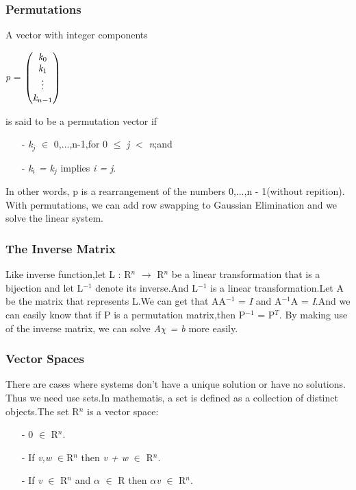 \documentclass{article}
\begin{document}
\subsubsection{Permutations}
A vector with integer components
\begin{center}
\emph{p} = 
\(
\begin{pmatrix}
    \emph{k}_{0} \\
    \emph{k}_{1} \\
    \vdots \\
    \emph{k}_{n-1} \\
\end{pmatrix}
\) 
\end{center}
is said to be a permutation vector if
\begin{itemize}
\item[-]\emph{k}$_{j}$ $\in$ {0,...,n-1},for 0 $\leq$ \emph{j} $<$ \emph{n};and
\item[-]\emph{k$_{i}$ = k$_{j}$} implies \emph{i = j}.
\end{itemize}
In other words, p is a rearrangement of the numbers 0,...,n - 1(without repition).\\
With permutations, we can add row swapping to Gaussian Elimination and we solve the linear system.

\subsubsection{The Inverse Matrix}
Like inverse function,let L : R$^{n}$ $\longrightarrow$ R$^{n}$ be a linear transformation that is a bijection and let L$^{-1}$ denote its inverse.And L$^{-1}$ is a linear transformation.Let A be the matrix that represents L.We can get that AA$^{-1}$ = \emph{I} and A$^{-1}$A = \emph{I}.And we can easily know that if P is a permutation matrix,then P$^{-1}$ = P$^{T}$. By making use of the inverse matrix, we can solve \emph{A$\chi$ = b} more easily.

\subsubsection{Vector Spaces}

There are cases where systems don't have a unique solution or have no solutions. Thus we need use sets.In mathematis, a set is defined as a collection of distinct objects.The set R$^{n}$ is a vector space:
\begin{itemize}
\item[-]0 $\in$ R$^{n}$.
\item[-]If \emph{v,w} $\in $R$^{n}$ then \emph{v + w} $\in$ R$^{n}$.
\item[-]If \emph{v} $\in$ R$^{n}$ and $\alpha$ $\in$ R then $\alpha$\emph{v} $\in$ R$^{n}$.
\end{itemize}
\end{document}
